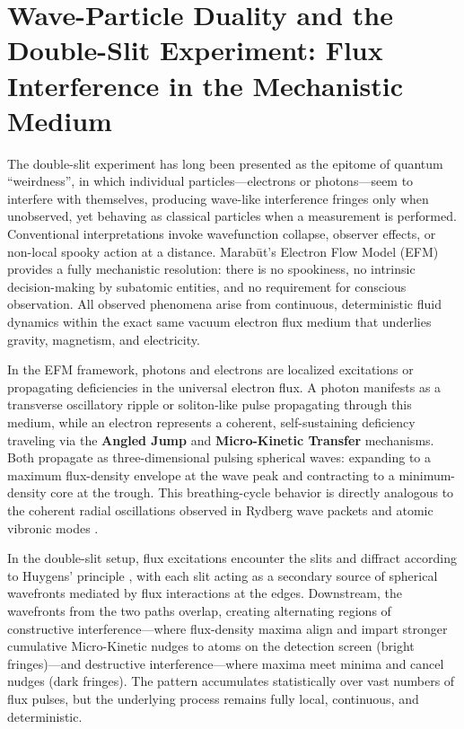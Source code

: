 \documentclass[11pt, a4paper]{article}
\begin{document}
\section{Wave-Particle Duality and the Double-Slit Experiment: Flux Interference in the Mechanistic Medium}

The double-slit experiment has long been presented as the epitome of quantum ``weirdness'', in which individual particles—electrons or photons—seem to interfere with themselves, producing wave-like interference fringes only when unobserved, yet behaving as classical particles when a measurement is performed. Conventional interpretations invoke wavefunction collapse, observer effects, or non-local spooky action at a distance. Marab\={u}t's Electron Flow Model (EFM) provides a fully mechanistic resolution: there is no spookiness, no intrinsic decision-making by subatomic entities, and no requirement for conscious observation. All observed phenomena arise from continuous, deterministic fluid dynamics within the exact same vacuum electron flux medium that underlies gravity, magnetism, and electricity.

In the EFM framework, photons and electrons are localized excitations or propagating deficiencies in the universal electron flux. A photon manifests as a transverse oscillatory ripple or soliton-like pulse propagating through this medium, while an electron represents a coherent, self-sustaining deficiency traveling via the \textbf{Angled Jump} and \textbf{Micro-Kinetic Transfer} mechanisms. Both propagate as three-dimensional pulsing spherical waves: expanding to a maximum flux-density envelope at the wave peak and contracting to a minimum-density core at the trough. This breathing-cycle behavior is directly analogous to the coherent radial oscillations observed in Rydberg wave packets and atomic vibronic modes \cite{chen1999}.

In the double-slit setup, flux excitations encounter the slits and diffract according to Huygens' principle \cite{huygens1690}, with each slit acting as a secondary source of spherical wavefronts mediated by flux interactions at the edges. Downstream, the wavefronts from the two paths overlap, creating alternating regions of constructive interference—where flux-density maxima align and impart stronger cumulative Micro-Kinetic nudges to atoms on the detection screen (bright fringes)—and destructive interference—where maxima meet minima and cancel nudges (dark fringes). The pattern accumulates statistically over vast numbers of flux pulses, but the underlying process remains fully local, continuous, and deterministic.
\end{document}
